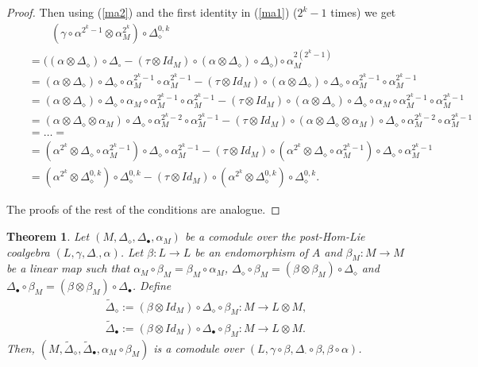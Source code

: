 \documentclass{article}
\newtheorem{thm}{Theorem}[section]
\theoremstyle{definition}
\theoremstyle{remark}
\numberwithin{equation}{section}
\begin{document}
\begin{proof}
Then using (\ref{ma2}) and  the first identity in (\ref{ma1}) ($2^k-1$ times) we get
\begin{eqnarray}
&&\qquad(\gamma\circ\alpha^{2^k-1}\otimes\alpha_M^{2^k})\circ\Delta^{0, k}_\diamond\nonumber\\
&&=\Big((\alpha\otimes\Delta_\diamond)\circ\Delta_\circ-(\tau\otimes Id_M)\circ(\alpha\otimes\Delta_\diamond)\circ\Delta_\diamond\Big)\circ\alpha_M^{2(2^k-1)}\nonumber\\
&&=(\alpha\otimes\Delta_\diamond)\circ\Delta_\diamond\circ\alpha_M^{2^k-1}\circ\alpha_M^{2^k-1}
-(\tau\otimes Id_M)\circ(\alpha\otimes\Delta_\diamond)\circ\Delta_\diamond\circ\alpha_M^{2^k-1}\circ\alpha_M^{2^k-1}\nonumber\\
&&=(\alpha\otimes\Delta_\diamond)\circ\Delta_\diamond\circ\alpha_M\circ\alpha_M^{2^k-1}\circ\alpha_M^{2^k-1}
-(\tau\otimes Id_M)\circ(\alpha\otimes\Delta_\diamond)\circ\Delta_\diamond\circ\alpha_M\circ\alpha_M^{2^k-1}\circ\alpha_M^{2^k-1}\nonumber\\
&&=(\alpha\otimes\Delta_\diamond\otimes\alpha_M)\circ\Delta_\diamond\circ\alpha_M^{2^k-2}\circ\alpha_M^{2^k-1}
-(\tau\otimes Id_M)\circ(\alpha\otimes\Delta_\diamond\otimes\alpha_M)\circ\Delta_\diamond\circ\alpha_M^{2^k-2}\circ\alpha_M^{2^k-1}\nonumber\\
&&=\dots=\nonumber\\
&&=(\alpha^{2^k}\otimes\Delta_\diamond\circ\alpha_M^{2^k-1})\circ\Delta_\diamond\circ\alpha_M^{2^k-1}
-(\tau\otimes Id_M)\circ(\alpha^{2^k}\otimes\Delta_\diamond\circ\alpha_M^{2^k-1})\circ\Delta_\diamond\circ\alpha_M^{2^k-1}\nonumber\\
&&=(\alpha^{2^k}\otimes\Delta^{0, k}_\diamond)\circ\Delta^{0, k}_\diamond-(\tau\otimes Id_M)\circ(\alpha^{2^k}\otimes\Delta^{0, k}_\diamond)\circ\Delta^{0, k}_\diamond\nonumber.
\end{eqnarray}

The proofs of the rest of the conditions are analogue.
\end{proof}
\begin{thm}
 Let $(M, \Delta_\diamond, \Delta_\bullet, \alpha_M)$ be a comodule over the post-Hom-Lie coalgebra $(L, \gamma, \Delta_\cdot, \alpha)$.
Let $\beta : L\rightarrow L$ be an endomorphism of $A$ and $\beta_M : M\rightarrow M$ be a linear map such that
$\alpha_M\circ\beta_M=\beta_M\circ\alpha_M$, $\Delta_\diamond\circ\beta_M=(\beta\otimes\beta_M)\circ\Delta_\diamond$ and 
$\Delta_\bullet\circ\beta_M=(\beta\otimes\beta_M)\circ\Delta_\bullet$.
Define
\begin{eqnarray}
\tilde\Delta_\diamond:=(\beta\otimes Id_M)\circ\Delta_\diamond\circ\beta_M :  M\rightarrow L\otimes M,\label{ms5}\\
\tilde\Delta_\bullet:=(\beta\otimes Id_M)\circ\Delta_\bullet\circ\beta_M :  M\rightarrow L\otimes M.\label{ms6}
\end{eqnarray}
Then, $(M, \tilde\Delta_\diamond, \tilde\Delta_\bullet, \alpha_M\circ\beta_M)$ is a comodule over $(L, \gamma\circ\beta, \Delta_\cdot\circ\beta, \beta\circ\alpha)$.
\end{thm}
\end{document}
